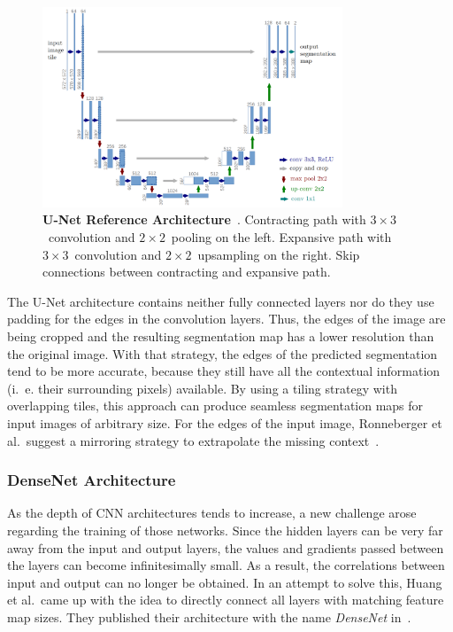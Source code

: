 \begin{figure}[h]
    \centering
    \includegraphics[width=0.8\textwidth]{images/u-net-architecture}
    \caption[U-Net Reference Architecture]
    {\textbf{U-Net Reference Architecture}~\cite{unet15}. Contracting path with $3\times 3$~convolution and $2\times 2$~pooling on the left. Expansive path with $3\times 3$~convolution and $2\times 2$~upsampling on the right. Skip connections between contracting and expansive path.}
    \label{fig:unet_architecture}
\end{figure}

The U-Net architecture contains neither fully connected layers nor do they use padding for the edges in the convolution layers. Thus, the edges of the image are being cropped and the resulting segmentation map has a lower resolution than the original image. With that strategy, the edges of the predicted segmentation tend to be more accurate, because they still have all the contextual information (i.~e. their surrounding pixels) available. By using a tiling strategy with overlapping tiles, this approach can produce seamless segmentation maps for input images of arbitrary size. For the edges of the input image, Ronneberger et al.\ suggest a mirroring strategy to extrapolate the missing context~\cite{unet15}.

\subsubsection{DenseNet Architecture}
\label{sec:densenet}
As the depth of CNN architectures tends to increase, a new challenge arose regarding the training of those networks. Since the hidden layers can be very far away from the input and output layers, the values and gradients passed between the layers can become infinitesimally small. As a result, the correlations between input and output can no longer be obtained. In an attempt to solve this, Huang et al.\ came up with the idea to directly connect all layers with matching feature map sizes. They published their architecture with the name \emph{DenseNet} in~\cite{densenet17}.

